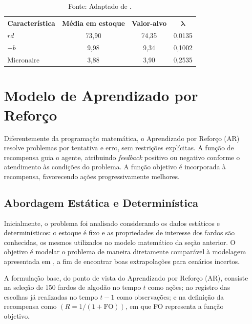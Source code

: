 \documentclass[a4paper,12pt]{article}
\begin{document}
\begin{table}[ht]
\centering
\caption{Médias no estoque, valores-alvo e pesos \(\boldsymbol{\lambda}\).}
\label{tab:valores_lambda}
\begin{tabular}{lccc}
\toprule
Característica & Média em estoque & Valor-alvo & \(\boldsymbol{\lambda}\) \\
\midrule
\(rd\)         & 73{,}90 & 74{,}35 & 0{,}0135 \\
\(+b\)         & 9{,}98  & 9{,}34  & 0{,}1002 \\
Micronaire     & 3{,}88  & 3{,}90  & 0{,}2535 \\
\bottomrule
\end{tabular}
\caption*{\small Fonte: Adaptado de .}

\end{table}

\section{Modelo de Aprendizado por Reforço}

Diferentemente da programação matemática, o Aprendizado por Reforço (AR) resolve problemas por tentativa e erro, sem restrições explícitas. A função de recompensa guia o agente, atribuindo \textit{feedback} positivo ou negativo conforme o atendimento às condições do problema. A função objetivo é incorporada à recompensa, favorecendo ações progressivamente melhores. 

\subsection{Abordagem Estática e Determinística}

Inicialmente, o problema foi analisado considerando os dados estáticos e determinísticos: o estoque é fixo e as propriedades de interesse dos fardos são conhecidas, os mesmos utilizados no modelo matemático da seção anterior. O objetivo é modelar o problema de maneira diretamente comparável à modelagem apresentada em \cite{takahashi_2016}, a fim de encontrar boas extrapolações para cenários incertos.

A formulação base, do ponto de vista do Aprendizado por Reforço (AR), consiste na seleção de 150 fardos de algodão no tempo \(t\) como ações; no registro das escolhas já realizadas no tempo \(t-1\) como observações; e na definição da recompensa como $( R = 1/(1 + \text{FO}) )$, em que FO representa a função objetivo.
\end{document}
